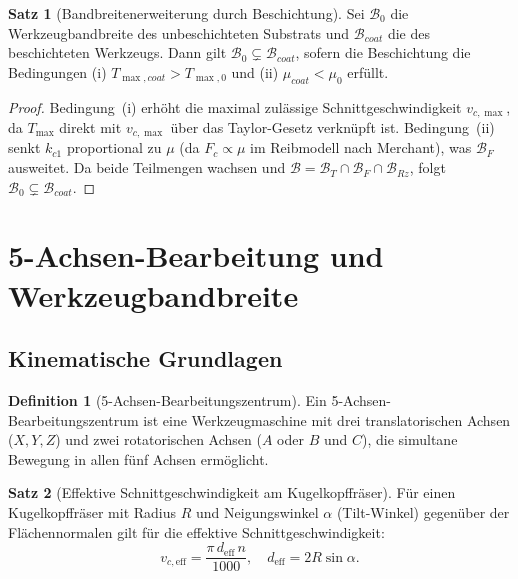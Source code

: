 ﻿\documentclass[a4paper,12pt]{article}
\theoremstyle{definition}
\newtheorem{definition}{Definition}
\newtheorem{satz}{Satz}
\begin{document}
\begin{satz}[Bandbreitenerweiterung durch Beschichtung]
\label{satz:beschichtung}
  Sei $\mathcal{B}_0$ die Werkzeugbandbreite des unbeschichteten Substrats und
  $\mathcal{B}_{coat}$ die des beschichteten Werkzeugs. Dann gilt
  $\mathcal{B}_0 \subsetneq \mathcal{B}_{coat}$, sofern die Beschichtung
  die Bedingungen (i) $T_{\max,coat} > T_{\max,0}$ und (ii) $\mu_{coat} < \mu_0$
  erfüllt.
\end{satz}

\begin{proof}
  Bedingung~(i) erhöht die maximal zulässige Schnittgeschwindigkeit $v_{c,\max}$,
  da $T_{\max}$ direkt mit $v_{c,\max}$ über das Taylor-Gesetz verknüpft ist.
  Bedingung~(ii) senkt $k_{c1}$ proportional zu $\mu$ (da $F_c \propto \mu$ im
  Reibmodell nach Merchant), was $\mathcal{B}_F$ ausweitet. Da beide Teilmengen
  wachsen und $\mathcal{B} = \mathcal{B}_T \cap \mathcal{B}_F \cap \mathcal{B}_{Rz}$,
  folgt $\mathcal{B}_0 \subsetneq \mathcal{B}_{coat}$. \qedhere
\end{proof}

\section{5-Achsen-Bearbeitung und Werkzeugbandbreite}
\label{sec:5achsen}

\subsection{Kinematische Grundlagen}

\begin{definition}[5-Achsen-Bearbeitungszentrum]
  Ein 5-Achsen-Bearbeitungszentrum ist eine Werkzeugmaschine mit drei translatorischen
  Achsen ($X, Y, Z$) und zwei rotatorischen Achsen ($A$ oder $B$ und $C$), die
  simultane Bewegung in allen fünf Achsen ermöglicht.
\end{definition}

\begin{satz}[Effektive Schnittgeschwindigkeit am Kugelkopffräser]
\label{satz:5achsen}
  Für einen Kugelkopffräser mit Radius $R$ und Neigungswinkel $\alpha$ (Tilt-Winkel)
  gegenüber der Flächennormalen gilt für die effektive Schnittgeschwindigkeit:
  \[
    v_{c,\text{eff}} = \frac{\pi \, d_{\text{eff}} \, n}{1000}, \quad
    d_{\text{eff}} = 2R\sin\alpha.
  \]
\end{satz}
\end{document}
